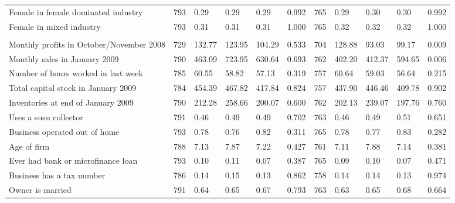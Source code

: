 \begin{table}[H]
{\begin{tabular}{lllllllllll}
\hspace{1em}Female in female dominated industry & 793 & 0.29 & 0.29 & 0.29 & 0.992 & 765 & 0.29 & 0.30 & 0.30 & 0.992\\
\hspace{1em}Female in mixed industry & 793 & 0.31 & 0.31 & 0.31 & 1.000 & 765 & 0.32 & 0.32 & 0.32 & 1.000\\
\addlinespace[0.3em]
\multicolumn{11}{l}{\textbf{Other variables}}\\
\hspace{1em}Monthly profits in October/November 2008 & 729 & 132.77 & 123.95 & 104.29 & 0.533 & 704 & 128.88 & 93.03 & 99.17 & 0.009\\
\hspace{1em}Monthly sales in January 2009 & 790 & 463.09 & 723.95 & 630.64 & 0.693 & 762 & 402.20 & 412.37 & 594.65 & 0.006\\
\hspace{1em}Number of hours worked in last week & 785 & 60.55 & 58.82 & 57.13 & 0.319 & 757 & 60.64 & 59.03 & 56.64 & 0.215\\
\hspace{1em}Total capital stock in January 2009 & 784 & 454.39 & 467.82 & 417.84 & 0.824 & 757 & 437.90 & 446.46 & 409.78 & 0.902\\
\hspace{1em}Inventories at end of January 2009 & 790 & 212.28 & 258.66 & 200.07 & 0.600 & 762 & 202.13 & 239.07 & 197.76 & 0.760\\
\hspace{1em}Uses a susu collector & 791 & 0.46 & 0.49 & 0.49 & 0.702 & 763 & 0.46 & 0.49 & 0.51 & 0.651\\
\hspace{1em}Business operated out of home & 793 & 0.78 & 0.76 & 0.82 & 0.311 & 765 & 0.78 & 0.77 & 0.83 & 0.282\\
\hspace{1em}Age of firm & 788 & 7.13 & 7.87 & 7.22 & 0.427 & 761 & 7.11 & 7.88 & 7.14 & 0.381\\
\hspace{1em}Ever had bank or microfinance loan & 793 & 0.10 & 0.11 & 0.07 & 0.387 & 765 & 0.09 & 0.10 & 0.07 & 0.471\\
\hspace{1em}Business has a tax number & 786 & 0.14 & 0.15 & 0.13 & 0.862 & 758 & 0.14 & 0.14 & 0.13 & 0.974\\
\hspace{1em}Owner is married & 791 & 0.64 & 0.65 & 0.67 & 0.793 & 763 & 0.63 & 0.65 & 0.68 & 0.664\\

\end{tabular}}
\end{table}
